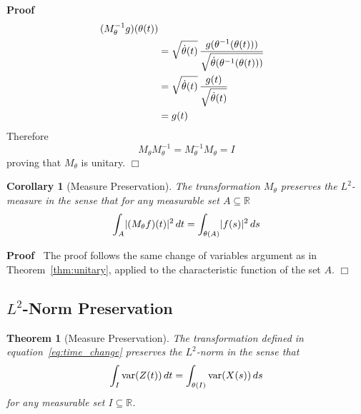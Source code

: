 \documentclass{article}
\newenvironment{proof}{\noindent\textbf{Proof\ }}{\hspace*{\fill}$\Box$\medskip}
\newtheorem{corollary}{Corollary}
\newtheorem{theorem}{Theorem}
\begin{document}
\begin{proof}
\begin{align}
\hspace{0.17em} (M_{\theta}^{- 1} g) (\theta (t)) \\
& = \sqrt{\dot{\theta} (t)} \hspace{0.17em} \frac{g (\theta^{- 1}
(\theta (t)))}{\sqrt{\dot{\theta} (\theta^{- 1} (\theta (t)))}} \\
& = \sqrt{\dot{\theta} (t)} \hspace{0.17em} \frac{g
(t)}{\sqrt{\dot{\theta} (t)}} \\
& = g (t)
\end{align}
Therefore
\begin{equation}
M_{\theta} M_{\theta}^{- 1} = M_{\theta}^{- 1} M_{\theta} = I
\end{equation}
proving that $M_{\theta}$ is unitary.
\end{proof}

\begin{corollary}
[Measure Preservation]\label{cor:measure_preserve} The transformation
$M_{\theta}$ preserves the $L^2$-measure in the sense that for any
measurable set $A \subseteq \mathbb{R}$
\begin{equation}
\label{eq:measure_preserve_sets} \int_A \lvert (M_{\theta} f) (t) \rvert^2
\hspace{0.17em} dt = \int_{\theta (A)} \lvert f (s) \rvert^2
\hspace{0.17em} ds
\end{equation}
\end{corollary}

\begin{proof}
The proof follows the same change of variables argument as in
Theorem~\ref{thm:unitary}, applied to the characteristic function of the set
$A$.
\end{proof}

\subsection{$L^2$-Norm Preservation}\label{sec:norm_preservation}

\begin{theorem}
[Measure Preservation]\label{thm:measure_preserve} The transformation
defined in equation~\eqref{eq:time_change} preserves the $L^2$-norm in the
sense that
\begin{equation}
\label{eq:measure_preserve} \int_I \mathrm{var} (Z (t)) \hspace{0.17em}
dt = \int_{\theta (I)} \mathrm{var} (X (s)) \hspace{0.17em} ds
\end{equation}
for any measurable set $I \subseteq \mathbb{R}$.
\end{theorem}
\end{document}
